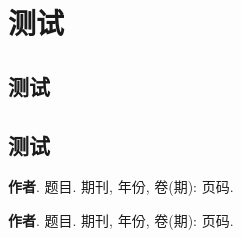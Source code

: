 \documentclass[library = {math.master}]{whuthesis}
\begin{document}
\chapter{测试}
\zhlipsum[1-4]
\section{测试}
\zhlipsum[1-4]
\section{测试}
\zhlipsum[1-4]
\nocite{*}


\printbibliography

\backmatter
\begin{publications}
  \item \textbf{作者}. 题目. 期刊, 年份, 卷(期): 页码.
  \item \textbf{作者}. 题目. 期刊, 年份, 卷(期): 页码.
\end{publications}

\begin{acknowledgement}
  \zhlipsum[1-2]
\end{acknowledgement}

\end{document}
